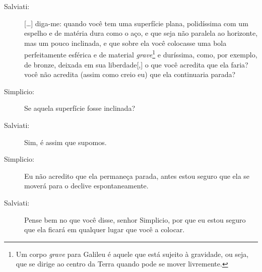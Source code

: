 \begin{description}
\item[Salviati:] [\dots] diga-me: quando você tem uma superfície plana, polidíssima com um espelho e de matéria dura como o aço, e que seja não paralela ao horizonte, mas um pouco inclinada, e que sobre ela você colocasse uma bola perfeitamente esférica e de material \emph{grave}\footnote{Um corpo \emph{grave} para Galileu é aquele que está sujeito à gravidade, ou seja, que se dirige ao centro da Terra quando pode se mover livremente.} e duríssima, como, por exemplo, de bronze, deixada em sua liberdade[,] o que você acredita que  ela faria? você não acredita (assim como creio eu) que ela continuaria parada?

\item[Simplicio:] Se aquela superfície fosse inclinada?

\item[Salviati:] Sim, é assim que supomos.

\item[Simplicio:] Eu não acredito que ela permaneça parada, antes estou seguro que ela se moverá para o declive espontaneamente.

\item[Salviati:] Pense bem no que você disse, senhor Simplicio, por que eu estou seguro que ela ficará em qualquer lugar que você a colocar.


\end{description}
